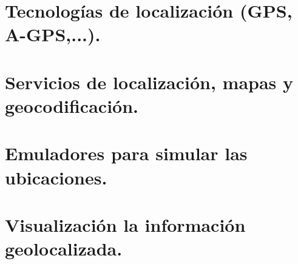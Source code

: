 \documentclass[a4paper,12pt,spanish]{sphinxmanual}
\begin{document}
\section{Tecnologías de localización (GPS, A-GPS,...).}
\label{index:tecnologias-de-localizacion-gps-a-gps}

\section{Servicios de localización, mapas y geocodificación.}
\label{index:servicios-de-localizacion-mapas-y-geocodificacion}

\section{Emuladores para simular las ubicaciones.}
\label{index:emuladores-para-simular-las-ubicaciones}

\section{Visualización la información geolocalizada.}
\label{index:visualizacion-la-informacion-geolocalizada}


\renewcommand{\indexname}{Índice}
\printindex
\end{document}
